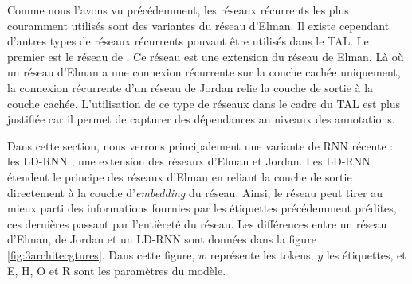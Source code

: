 \documentclass[citation\_needed]{subfiles}
\begin{document}
Comme nous l'avons vu précédemment, les réseaux récurrents les plus couramment utilisés sont des variantes du réseau d'Elman. Il existe cependant d'autres types de réseaux récurrents pouvant être utilisés dans le TAL. Le premier est le réseau de \citet{jordan1986serial}. Ce réseau est une extension du réseau de Elman. Là où un réseau d'Elman a une connexion récurrente sur la couche cachée uniquement, la connexion récurrente d'un réseau de Jordan relie la couche de sortie à la couche cachée. L'utilisation de ce type de réseaux dans le cadre du TAL est plus justifiée car il permet de capturer des dépendances au niveaux des annotations.

Dans cette section, nous verrons principalement une variante de RNN récente : les LD-RNN \citep{dinarelli2016etude,dupont2017a}, une extension des réseaux d'Elman et Jordan. Les LD-RNN étendent le principe des réseaux d'Elman en reliant la couche de sortie directement à la couche d'\textit{embedding} du réseau. Ainsi, le réseau peut tirer au mieux parti des informations fournies par les étiquettes précédemment prédites, ces dernières passant par l'entièreté du réseau. Les différences entre un réseau d'Elman, de Jordan et un LD-RNN sont données dans la figure \ref{fig:3architecgtures}. Dans cette figure, $w$ représente les tokens, $y$ les étiquettes, et E, H, O et R sont les paramètres du modèle.
\end{document}
